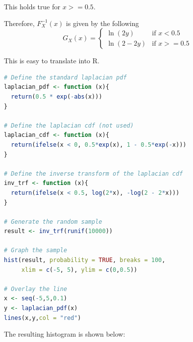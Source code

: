 \documentclass{amsart}
\theoremstyle{definition}
\theoremstyle{remark}
\begin{document}
\begin{enumerate}
This holds true for $x >= 0.5$.

Therefore, $F^{-1}_X(x)$ is given by the following
$$G_X(x) = \begin{cases}
    \ln{(2y)} & \text{if $x < 0.5$} \\
    \ln{(2 - 2y)} & \text{if $x >= 0.5$}
    \end{cases}
$$

This is easy to translate into R. 

\begin{lstlisting}[language=R]
# Define the standard laplacian pdf
laplacian_pdf <- function (x){
  return(0.5 * exp(-abs(x)))
}

# Define the laplacian cdf (not used)
laplacian_cdf <- function (x){
  return(ifelse(x < 0, 0.5*exp(x), 1 - 0.5*exp(-x)))
}

# Define the inverse transform of the laplacian cdf
inv_trf <- function (x){
  return(ifelse(x < 0.5, log(2*x), -log(2 - 2*x)))
}

# Generate the random sample
result <- inv_trf(runif(10000))

# Graph the sample
hist(result, probability = TRUE, breaks = 100,
     xlim = c(-5, 5), ylim = c(0,0.5))

# Overlay the line
x <- seq(-5,5,0.1)
y <- laplacian_pdf(x)
lines(x,y,col = "red")
\end{lstlisting}

The resulting histogram is shown below:



\end{enumerate}
\end{document}
